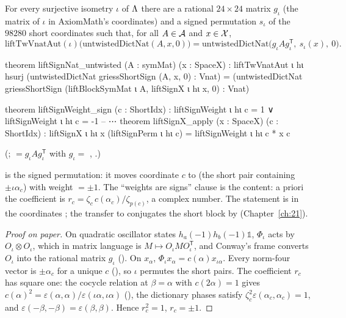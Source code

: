\begin{theorem}\label{ch22:thm:untwistedblock}
For every surjective isometry $\iota$ of ${\Lambda}$ there are a rational $24\times24$ matrix $g_\iota$ (the matrix of $\iota$ in
AxiomMath's coordinates) and a signed permutation $s_\iota$ of the $98280$ short coordinates such that, for all
$A\in\mathcal{A}$ and $x\in\mathcal{X}$,
\begin{equation*}
  \mathrm{liftTwVnatAut}(\iota)\bigl(\mathrm{untwistedDictNat}(A,x,0)\bigr)=\mathrm{untwistedDictNat}\bigl(g_\iota A
  g_\iota^{\mathsf T},\ s_\iota(x),\ 0\bigr).
\end{equation*}
\end{theorem}
\begin{leancode}
theorem liftSignNat_untwisted (A : symMat) (x : SpaceX) :
    liftTwVnatAut ι hι hsurj
        (untwistedDictNat griessShortSign (A, x, 0) : Vnat) =
      (untwistedDictNat griessShortSign
        (liftBlockSymMat ι A, liftSignX ι hι x, 0) : Vnat)
\end{leancode}
\begin{leancode}
theorem liftSignWeight_sign (c : ShortIdx) :
    liftSignWeight ι hι c = 1 ∨ liftSignWeight ι hι c = -1
-- ⋯
theorem liftSignX_apply (x : SpaceX) (c : ShortIdx) :
    liftSignX ι hι x (liftSignPerm ι hι c) = liftSignWeight ι hι c * x c
\end{leancode}
(;  $=g_\iota Ag_\iota^{\mathsf T}$ with
$g_\iota=$ , .)
\begin{dictionary}
 is the signed permutation: it moves coordinate $c$ to  (the short
pair containing $\pm\iota\alpha_c$) with weight  $=\pm1$.  The ``weights are signs'' clause is
the content: a priori the coefficient is $r_c=\zeta_c\,c(\alpha_c)/\zeta_{p(c)}$, a complex number.  The statement is
in the coordinates ; the transfer to  conjugates the short block by
 (Chapter~\ref{ch:21}).
\end{dictionary}
\begin{proof}[Proof on paper]
On quadratic oscillator states $h_a(-1)h_b(-1)\mathbb 1$, $\Phi_\iota$ acts by $O_\iota\otimes O_\iota$, which in
matrix language is $M\mapsto O_\iota MO_\iota^{\mathsf T}$, and Conway's frame converts $O_\iota$ into the rational matrix
$g_\iota$ ().  On $x_\alpha$, $\Phi_\iota x_\alpha=c(\alpha)x_{\iota\alpha}$.  Every norm-four
vector is $\pm\alpha_c$ for a unique $c$ (), so $\iota$ permutes the short pairs.  The
coefficient $r_c$ has square one: the cocycle relation at $\beta=\alpha$ with $c(2\alpha)=1$ gives
$c(\alpha)^2=\varepsilon(\alpha,\alpha)/\varepsilon(\iota\alpha,\iota\alpha)$ (), the dictionary phases
satisfy $\zeta_c^2\varepsilon(\alpha_c,\alpha_c)=1$, and $\varepsilon(-\beta,-\beta)=\varepsilon(\beta,\beta)$.  Hence
$r_c^2=1$, $r_c=\pm1$.
\end{proof}
